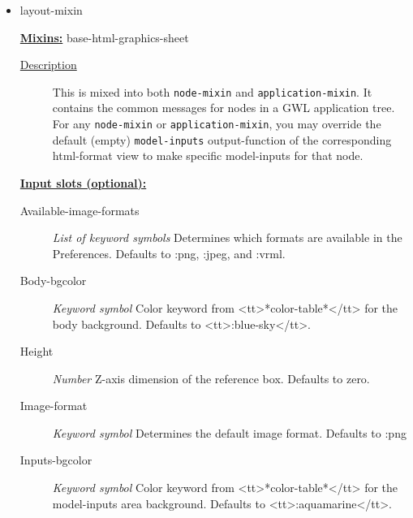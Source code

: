 \documentclass [11pt]{book}
\begin{document}
\begin{itemize}
\item {}layout-mixin


\textbf{
\underline{Mixins:}} base-html-graphics-sheet





\begin{description}

\item [
\underline{Description}]


This is mixed into both \texttt{node-mixin} and \texttt{application-mixin}. It contains the common
messages for nodes in a GWL application tree. For any \texttt{node-mixin} or \texttt{application-mixin}, you may override the default (empty)
\texttt{model-inputs} output-function of the corresponding html-format view to make specific model-inputs for that node.



\end{description}








\textbf{
\underline{Input slots (optional):}}

\begin{description}

\item [Available-image-formats]
\emph{List of keyword symbols} Determines which formats are available in the Preferences. Defaults to :png, :jpeg, and :vrml.


\item [Body-bgcolor]
\emph{Keyword symbol} Color keyword from <tt>*color-table*</tt> for the body background. Defaults to <tt>:blue-sky</tt>.


\item [Height]
\emph{Number} Z-axis dimension of the reference box. Defaults to zero.


\item [Image-format]
\emph{Keyword symbol} Determines the default image format. Defaults to :png


\item [Inputs-bgcolor]
\emph{Keyword symbol} Color keyword from <tt>*color-table*</tt> for the model-inputs area background. Defaults to <tt>:aquamarine</tt>.



\end{description}
\end{itemize}
\end{document}
